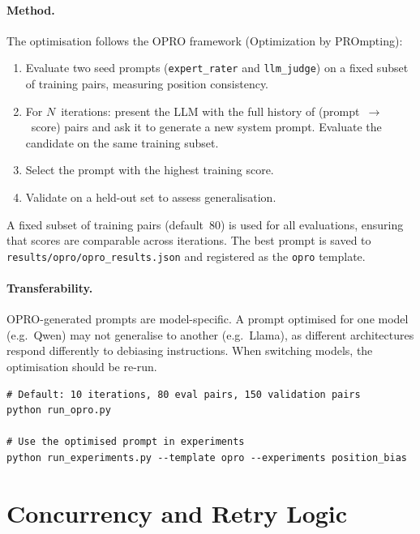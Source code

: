 \documentclass[11pt,a4paper]{article}
\begin{document}
\paragraph{Method.}
The optimisation follows the OPRO framework (Optimization by PROmpting):
\begin{enumerate}[nosep]
  \item Evaluate two seed prompts (\texttt{expert\_rater} and
        \texttt{llm\_judge}) on a fixed subset of training pairs, measuring
        position consistency.
  \item For $N$~iterations: present the LLM with the full history of
        (prompt~$\to$~score) pairs and ask it to generate a new system prompt.
        Evaluate the candidate on the same training subset.
  \item Select the prompt with the highest training score.
  \item Validate on a held-out set to assess generalisation.
\end{enumerate}

A fixed subset of training pairs (default~80) is used for all evaluations,
ensuring that scores are comparable across iterations. The best prompt is
saved to \texttt{results/opro/opro\_results.json} and registered as the
\texttt{opro} template.

\paragraph{Transferability.}
OPRO-generated prompts are model-specific. A prompt optimised for one model
(e.g.\ Qwen) may not generalise to another (e.g.\ Llama), as different
architectures respond differently to debiasing instructions. When switching
models, the optimisation should be re-run.

\begin{lstlisting}[title={\small OPRO usage}]
# Default: 10 iterations, 80 eval pairs, 150 validation pairs
python run_opro.py

# Use the optimised prompt in experiments
python run_experiments.py --template opro --experiments position_bias
\end{lstlisting}


\newpage
\section{Concurrency and Retry Logic}\label{sec:concurrency}
\end{document}
